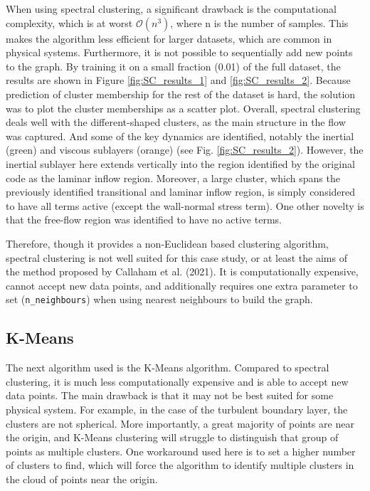 \documentclass[12pt]{report} %
\begin{document}
When using spectral clustering, a significant drawback is the computational complexity, which is at worst $\mathcal{O}(n^3)$, where n is the number of samples. This makes the algorithm less efficient for larger datasets, which are common in physical systems. Furthermore, it is not possible to sequentially add new points to the graph. By training it on a small fraction (0.01) of the full dataset, the results are shown in Figure \ref{fig:SC_results_1} and \ref{fig:SC_results_2}. Because prediction of cluster membership for the rest of the dataset is hard, the solution was to plot the cluster memberships as a scatter plot. Overall, spectral clustering deals well with the different-shaped clusters, as the main structure in the flow was captured. And some of the key dynamics are identified, notably the inertial (green) and viscous sublayers (orange) (see Fig. \ref{fig:SC_results_2}). However, the inertial sublayer here extends vertically into the region identified by the original code as the laminar inflow region. Moreover, a large cluster, which spans the previously identified transitional and laminar inflow region, is simply considered to have all terms active (except the wall-normal stress term). One other novelty is that the free-flow region was identified to have no active terms.

Therefore, though it provides a non-Euclidean based clustering algorithm, spectral clustering is not well suited for this case study, or at least the aims of the method proposed by Callaham et al. (2021)\cite{callaham2021learning}. It is computationally expensive, cannot accept new data points, and additionally requires one extra parameter to set (\texttt{n\_neighbours}) when using nearest neighbours to build the graph.


\subsection{K-Means}

The next algorithm used is the K-Means algorithm. Compared to spectral clustering, it is much less computationally expensive and is able to accept new data points. The main drawback is that it may not be best suited for some physical system. For example, in the case of the turbulent boundary layer, the clusters are not spherical. More importantly, a great majority of points are near the origin, and K-Means clustering will struggle to distinguish that group of points as multiple clusters. One workaround used here is to set a higher number of clusters to find, which will force the algorithm to identify multiple clusters in the cloud of points near the origin.
\end{document}

